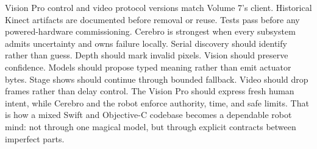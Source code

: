 \markdownRendererUlItem \markdownRendererUntickedBox{} Vision Pro control and video protocol versions match Volume 7's client.\markdownRendererUlItemEnd 
\markdownRendererUlItem \markdownRendererUntickedBox{} Historical Kinect artifacts are documented before removal or reuse.\markdownRendererUlItemEnd 
\markdownRendererUlItem \markdownRendererUntickedBox{} Tests pass before any powered-hardware commissioning.\markdownRendererUlItemEnd 
\markdownRendererUlEnd \markdownRendererInterblockSeparator
{}
\markdownRendererSectionEnd \markdownRendererSectionBegin
{}\markdownRendererInterblockSeparator
{}Cerebro is strongest when every subsystem admits uncertainty and owns failure locally. Serial discovery should identify rather than guess. Depth should mark invalid pixels. Vision should preserve confidence. Models should propose typed meaning rather than emit actuator bytes. Stage shows should continue through bounded fallback. Video should drop frames rather than delay control. The Vision Pro should express fresh human intent, while Cerebro and the robot enforce authority, time, and safe limits.\markdownRendererParagraphSeparator
{}That is how a mixed Swift and Objective-C codebase becomes a dependable robot mind: not through one magical model, but through explicit contracts between imperfect parts.
\markdownRendererSectionEnd \markdownRendererDocumentEnd